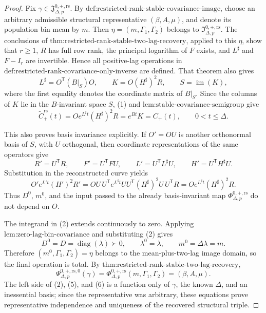 \documentclass{article}
\begin{document}
\begin{proof}
Fix \(\gamma\in\mathfrak J_{\Delta,p}^{0,+,\mathrm{rs}}\).  By \(\text{def:restricted-rank-stable-covariance-image}\), choose an arbitrary admissible structural representative \((\beta,A,\mu)\), and denote its population bin mean by \(m\).  Then \(\eta=(m,\Gamma_1,\Gamma_2)\) belongs to \(\mathfrak I_{\Delta,p}^{0,+,\mathrm{rs}}\).  The conclusions of \(\text{thm:restricted-rank-stable-two-lag-recovery}\), applied to this \(\eta\), show that \(r\geq1\), \(R\) has full row rank, the principal logarithm of \(F\) exists, and \(L^\sharp\) and \(F-I_r\) are invertible.  Hence all positive-lag operations in \(\text{def:restricted-rank-covariance-only-inverse}\) are defined.  That theorem also gives
\[
 L^\sharp=O^{\mathsf T}(B|_S)O,\qquad
 K=O(H^\sharp)^2R,\qquad S=\operatorname{im}(K),
\tag{1}
\]
where the first equality denotes the coordinate matrix of \(B|_S\).  Since the columns of \(K\) lie in the \(B\)-invariant space \(S\), (1) and \(\text{lem:stable-covariance-semigroup}\) give
\[
 \widetilde C_{+}^{\mathrm{rs}}(t)
 =Oe^{L^\sharp t}(H^\sharp)^2R
 =e^{Bt}K=C_{+}(t),
 \qquad 0<t\leq\Delta.
\tag{2}
\]

This also proves basis invariance explicitly.  If \(O'=OU\) is another orthonormal basis of \(S\), with \(U\) orthogonal, then coordinate representations of the same operators give
\[
 R'=U^{\mathsf T}R,\qquad
 F'=U^{\mathsf T}FU,\qquad
 L'=U^{\mathsf T}L^\sharp U,\qquad
 H'=U^{\mathsf T}H^\sharp U.
\tag{3}
\]
Substitution in the reconstructed curve yields
\[
 O'e^{L't}(H')^2R'
 =OU\,U^{\mathsf T}e^{L^\sharp t}U
   U^{\mathsf T}(H^\sharp)^2U\,U^{\mathsf T}R
 =Oe^{L^\sharp t}(H^\sharp)^2R.
\tag{4}
\]
Thus \(D^0\), \(m^0\), and the input passed to the already basis-invariant map \(\Phi_{\Delta,p}^{0,+,\mathrm{rs}}\) do not depend on \(O\).

The integrand in (2) extends continuously to zero.  Applying \(\text{lem:zero-lag-bin-covariance}\) and substituting (2) gives
\[
 D^0=D=\operatorname{diag}(\lambda)\succ0,\qquad
 \lambda^0=\lambda,\qquad m^0=\Delta\lambda=m.
\tag{5}
\]
Therefore \((m^0,\Gamma_1,\Gamma_2)=\eta\) belongs to the mean-plus-two-lag image domain, so the final operation is total.  By \(\text{thm:restricted-rank-stable-two-lag-recovery}\),
\[
 \Psi_{\Delta,p}^{0,+,\mathrm{rs},0}(\gamma)
 =\Phi_{\Delta,p}^{0,+,\mathrm{rs}}(m,\Gamma_1,\Gamma_2)
 =(\beta,A,\mu).
\tag{6}
\]
The left side of (2), (5), and (6) is a function only of \(\gamma\), the known \(\Delta\), and an inessential basis; since the representative was arbitrary, these equations prove representative independence and uniqueness of the recovered structural triple.


\end{proof}
\end{document}
